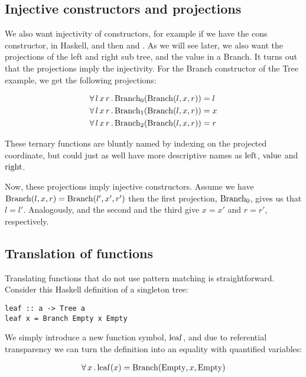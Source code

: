 \subsection{Injective constructors and projections}

We also want injectivity of constructors, for example if we have the
cons constructor, \hs{:} in Haskell, and  then
 and . As we will see later, we also want the
projections of the left and right sub tree, and the value in a Branch.
It turns out that the projections imply the injectivity. For the Branch
constructor of the Tree example, we get the following projections:

\begin{align*}
 \forall \, l \, x \, r \, . \,  \mathrm{Branch_{0}}(\mathrm{Branch}(l,x,r)) &  = l\\
 \forall \, l \, x \, r \, . \,  \mathrm{Branch_{1}}(\mathrm{Branch}(l,x,r)) &  = x\\
 \forall \, l \, x \, r \, . \,  \mathrm{Branch_{2}}(\mathrm{Branch}(l,x,r)) &  = r\\
\end{align*}

These ternary functions are bluntly named by indexing on the projected
coordinate, but could just as well have more descriptive names as
$\mathrm{left}$, $\mathrm{value}$ and $\mathrm{right}$.

Now, these projections imply injective constructors. Assume we have
$\mathrm{Branch}(l,x,r) = \mathrm{Branch}(l',x',r')$ then the first
projection, $\mathrm{Branch_0}$, gives us that $l=l'$. Analogously,
and the second and the third give $x=x'$ and $r=r'$, respectively.

\subsection{Translation of functions}

Translating functions that do not use pattern matching is
straightforward. Consider this Haskell definition of a singleton tree:

\begin{verbatim}
leaf :: a -> Tree a
leaf x = Branch Empty x Empty
\end{verbatim}

We simply introduce a new function symbol, $\mathrm{leaf}$, and due
to referential transparency we can turn the definition into an
equality with quantified variables:

\begin{align*}
 \forall \, x \, . \, \mathrm{leaf}(x) &  = \mathrm{Branch}(\mathrm{Empty},x,\mathrm{Empty})\\
\end{align*}

